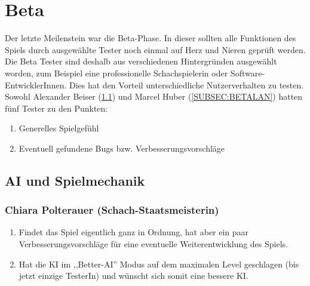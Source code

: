 \documentclass[12pt,a4paper]{article}
\begin{document}
\clearpage\vfill\newpage{}
\section{Beta}
\label{SEC:beta}

Der letzte Meilenstein war die Beta-Phase. In dieser sollten alle Funktionen des Spiels durch ausgewählte Tester noch einmal auf Herz und Nieren geprüft werden. Die Beta Tester sind deshalb aus verschiedenen Hintergründen ausgewählt worden, zum Beispiel eine professionelle Schachspielerin oder Software-EntwicklerInnen. Dies hat den Vorteil unterschiedliche Nutzerverhalten zu testen. \\[1ex]
Sowohl Alexander Beiser (\ref{SUBSEC:BETAGAME}) und Marcel Huber (\ref{SUBSEC:BETALAN}) hatten fünf Tester zu den Punkten:
\begin{enumerate}[I]
	\item{Generelles Spielgefühl}
	\item{Eventuell gefundene Bugs bzw. Verbesserungsvorschläge}
\end{enumerate}

\subsection{AI und Spielmechanik}
\label{SUBSEC:BETAGAME}

\subsubsection*{Chiara Polterauer (Schach-Staatsmeisterin)}
\begin{enumerate}[I]
	\item{Findet das Spiel eigentlich ganz in Ordnung, hat aber ein paar Verbesserungsvorschläge für eine eventuelle Weiterentwicklung des Spiels.}
	\item{Hat die KI im ,,Better-AI'' Modus auf dem maximalen Level geschlagen (bis jetzt einzige TesterIn) und wünscht sich somit eine bessere KI. }
\end{enumerate}
\end{document}
